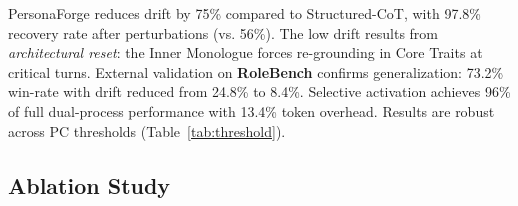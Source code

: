 \documentclass[11pt]{article}
\begin{document}
\begin{CJK*}{UTF8}{gbsn}
\begin{table}[t]
\centering
\small
{}
\caption{Long-dialogue (50 turns). Drift=\% turns PC$<$0.6. Recov.=\% recovering to PC$\geq$0.7 within 5 turns.}
\label{tab:longdialogue}
\end{table}

PersonaForge reduces drift by 75\% compared to Structured-CoT, with 97.8\% recovery rate after perturbations (vs. 56\%). The low drift results from \textit{architectural reset}: the Inner Monologue forces re-grounding in Core Traits at critical turns. External validation on \textbf{RoleBench} \citep{wang2024rolellm} confirms generalization: 73.2\% win-rate with drift reduced from 24.8\% to 8.4\%. Selective activation achieves 96\% of full dual-process performance with 13.4\% token overhead. Results are robust across PC thresholds (Table~\ref{tab:threshold}).

\subsection{Ablation Study}
\label{sec:ablation}


\end{CJK*}
\end{document}
